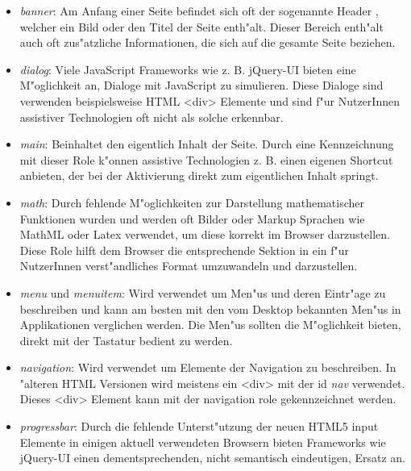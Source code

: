 \documentclass[a4paper,bibtotoc,oneside]{scrbook}
\begin{document}
\begin{itemize}
\item \emph{banner}: Am Anfang einer Seite befindet sich oft der sogenannte \glqq Header \grqq, welcher ein Bild oder den Titel der Seite enth"alt. Dieser Bereich enth"alt auch oft zus"atzliche Informationen, die sich auf die gesamte Seite beziehen. \cite[Abschnitt 5.4, banner]{aria_roles}

\item \emph{dialog}: Viele JavaScript Frameworks wie z. B. jQuery-UI \cite{jquery_ui} bieten eine M"oglichkeit an, Dialoge mit JavaScript zu simulieren. Diese Dialoge sind verwenden beispielsweise HTML <div> Elemente und sind f"ur NutzerInnen assistiver Technologien oft nicht als solche erkennbar. \cite[Abschnitt 5.4, dialog]{aria_roles}

\item \emph{main}: Beinhaltet den eigentlich Inhalt der Seite. Durch eine Kennzeichnung mit dieser Role k"onnen assistive Technologien z. B. einen eigenen Shortcut anbieten, der bei der Aktivierung direkt zum eigentlichen Inhalt springt. \cite[Abschnitt 5.4, main]{aria_roles}

\item \emph{math}: Durch fehlende M"oglichkeiten zur Darstellung mathematischer Funktionen wurden und werden oft Bilder oder Markup Sprachen wie MathML oder Latex verwendet, um diese korrekt im Browser darzustellen. Diese Role hilft dem Browser die entsprechende Sektion in ein f"ur NutzerInnen verst"andliches Format umzuwandeln und darzustellen. \cite[Abschnitt 5.4, math]{aria_roles}

\item \emph{menu} und \emph{menuitem}: Wird verwendet um Men"us und deren Eintr"age zu beschreiben und kann am besten mit den vom Desktop bekannten Men"us in Applikationen verglichen werden. Die Men"us sollten die M"oglichkeit bieten, direkt mit der Tastatur bedient zu werden. \cite[Abschnitt 5.4, menu, menuitem]{aria_roles}

\item \emph{navigation}: Wird verwendet um Elemente der Navigation zu beschreiben. In "alteren HTML Versionen wird meistens ein <div> mit der id \emph{nav} verwendet. Dieses <div> Element kann mit der navigation role gekennzeichnet werden. \cite[Abschnitt 5.4, navigation]{aria_roles}

\item \emph{progressbar}: Durch die fehlende Unterst"utzung der neuen HTML5 input Elemente in einigen aktuell verwendeten Browsern bieten Frameworks wie jQuery-UI\cite{jquery_ui} einen dementsprechenden, nicht semantisch eindeutigen, Ersatz an. \cite[Abschnitt 5.4, progressbar]{aria_roles}


\end{itemize}
\end{document}
